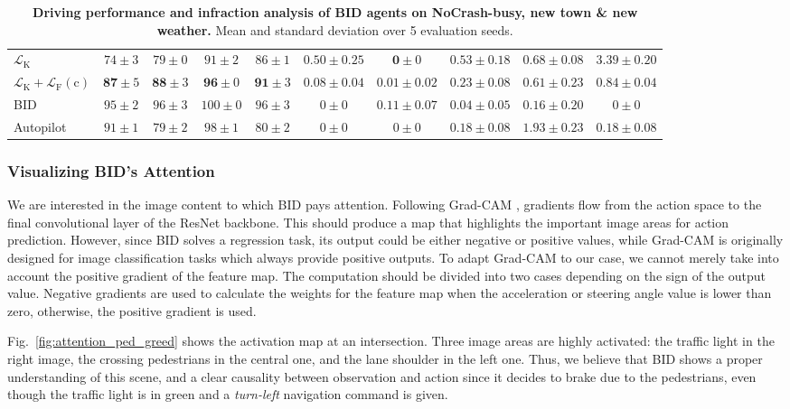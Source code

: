 \begin{table}
\begin{tabular}{lccccccccc}
		$\mathcal{L}_\text{K}$
		& $74\pm3$ & $79\pm0$ & $91\pm2$ & $86\pm1$ 
		& $0.50\pm0.25$ & $\mathbf{0}\pm0$ & $0.53\pm0.18$ & $0.68\pm0.08$ & $3.39\pm0.20$ \\
		$\mathcal{L}_\text{K}+\mathcal{L}_\text{F}(\text{c})$
		& $\mathbf{87} \pm 5$ & $\mathbf{88} \pm 3$ & $\mathbf{96} \pm 0$ & $\mathbf{91} \pm 3$ 
		& $\mathbf{0.08} \pm 0.04$ & $0.01 \pm 0.02$ & $\mathbf{0.23} \pm 0.08$ & $\mathbf{0.61} \pm 0.23$ & $\mathbf{0.84} \pm 0.04$ \\
		\cmidrule(lr){1-1}\cmidrule(lr){2-5}\cmidrule(lr){6-10}
		BID
		& $95 \pm 2$ & $96 \pm 3$ & $100 \pm 0$ & $96 \pm 3$ 
		& $0 \pm 0$ & $0.11 \pm 0.07$ & $0.04 \pm 0.05$ & $0.16 \pm 0.20$ & $0 \pm 0$ \\
		Autopilot
		& $91 \pm 1$ & $79 \pm 2$ & $98 \pm 1$ & $80 \pm 2$ 
		& $0 \pm 0$ & $0 \pm 0$ & $0.18 \pm 0.08$ & $1.93 \pm 0.23$ & $0.18 \pm 0.08$\\
		\bottomrule
	\end{tabular}
	\vspace{-1ex}
	\caption{\textbf{Driving performance and infraction analysis of BID agents on NoCrash-busy, new town \& new weather.} 
		Mean and standard deviation over 5 evaluation seeds.}
	\vspace{-2.5ex}
	\label{table:infraction}
\end{table}


\subsubsection{Visualizing BID's Attention}
\label{sec:Visualization}
We are interested in the image content to which BID pays attention. 
Following Grad-CAM \cite{Selvaraju:2017}, gradients flow from the action space to the final convolutional layer of the ResNet backbone. 
This should produce a map that highlights the important image areas for action prediction. 
However, since BID solves a regression task, its output could be either negative or positive values, while Grad-CAM is originally designed for image classification tasks which always provide positive outputs. 
To adapt Grad-CAM to our case, we cannot merely take into account the positive gradient of the feature map. 
The computation should be divided into two cases depending on the sign of the output value. 
Negative gradients are used to calculate the weights for the feature map when the acceleration or steering angle value is lower than zero, otherwise, the positive gradient is used.


Fig.~\ref{fig:attention_ped_greed} shows the activation map at an intersection. 
Three image areas are highly activated: the traffic light in the right image, the crossing pedestrians in the central one, and the lane shoulder in the left one. 
Thus, we believe that BID shows a proper understanding of this scene, and a clear causality between observation and action since it decides to brake due to the pedestrians, even though the traffic light is in green and a \emph{turn-left} navigation command is given.

